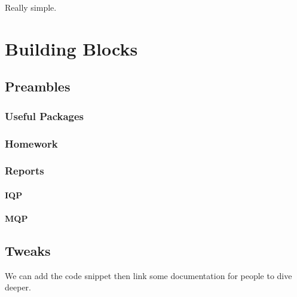 \documentclass[12pt]{article}
\begin{document}
Really simple.

\section{Building Blocks}%
\label{bbs}

\subsection{Preambles}%
\label{bbs.preambles}

\subsubsection{Useful Packages}%
\label{bbs.preambles.packages}

\subsubsection{Homework}%
\label{bbs.preambles.homework}

\subsubsection{Reports}%
\label{bbs.preambles.reports}

\paragraph{IQP}%
\label{bbs.preambles.reports.iqp}

\paragraph{MQP}%
\label{bbs.preambles.reports.mqp}

\subsection{Tweaks}%
\label{bbs.tweaks}

We can add the code snippet then link some documentation for people to dive deeper.
\end{document}
